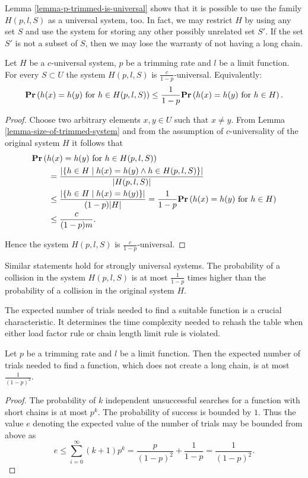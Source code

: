 \documentclass[runningheads,a4paper]{llncs}
\begin{document}
Lemma \ref{lemma-p-trimmed-is-universal} shows that it is possible to use the family $H(p, l, S)$ as a universal system, too. In fact, we may restrict $H$ by using any set $S$ and use the system for storing any other possibly unrelated set $S'$. If the set $S'$ is not a subset of $S$, then we may lose the warranty of not having a long chain.
\begin{lemma}
\label{lemma-p-trimmed-is-universal}
Let $H$ be a $c$-universal system, $p$ be a trimming rate and $l$ be a limit function. For every $S \subset U$ the system $H(p, l, S)$ is $\frac{c}{1 - p}$-universal. Equivalently:
\[
	\mathbf{Pr}\left(h(x) = h(y) \text{ for } h \in H(p, l, S)\right) \leq \frac{1}{1 - p} \mathbf{Pr}\left(h(x) = h(y) \text{ for } h \in H\right) \text{.}
\]
\begin{proof}
Choose two arbitrary elements $x, y \in U$ such that $x \neq y$. From Lemma \ref{lemma-size-of-trimmed-system} and from the assumption of $c$-universality of the original system $H$ it follows that 
\[
\begin{split}
& \mathbf{Pr}\left(h(x) = h(y) \text{ for } h \in H(p, l, S)\right)  \\
	& \qquad =  \frac{|\{ h \in H \mid h(x) = h(y) \wedge h \in H(p, l, S)\}|}{|H(p, l, S)|} \\
	& \qquad \leq \frac{|\{ h \in H \mid h(x) = h(y) \}|}{(1 - p)|H|} = \frac{1}{1 - p} \mathbf{Pr}\left(h(x) = h(y) \text{ for } h \in H\right) \\
	& \qquad \leq \frac{c}{(1 - p) m} \text{.}
\end{split}
\]

Hence the system $H(p, l, S)$ is $\frac{c}{1 - p}$-universal.
\end{proof}
\end{lemma}

Similar statements hold for strongly universal systems. The probability of a collision in the system $H(p, l, S)$ is at most $\frac{1}{1 - p}$ times higher than the probability of a collision in the original system $H$.

The expected number of trials needed to find a suitable function is a crucial characteristic. It determines the time complexity needed to rehash the table when either load factor rule or chain length limit rule is violated. 

\begin{lemma}
\label{lemma-linear-transformations-trials}
Let $p$ be a trimming rate and $l$ be a limit function. Then the expected number of trials needed to find a function, which does not create a long chain, is at most $\frac{1}{(1 - p) ^ 2}$.
\end{lemma}
\begin{proof}
The probability of $k$ independent unsuccessful searches for a function with short chains is at most $p ^ k$. The probability of success is bounded by $1$. Thus the value $e$ denoting the expected value of the number of trials may be bounded from above as
\[
e \leq \sum_{i = 0}^{\infty} (k + 1)p^k = \frac{p}{(1 - p) ^ 2} + \frac{1}{1 - p} = \frac{1}{(1 - p) ^ 2} \text{.}
\]
\end{proof}
\end{document}

